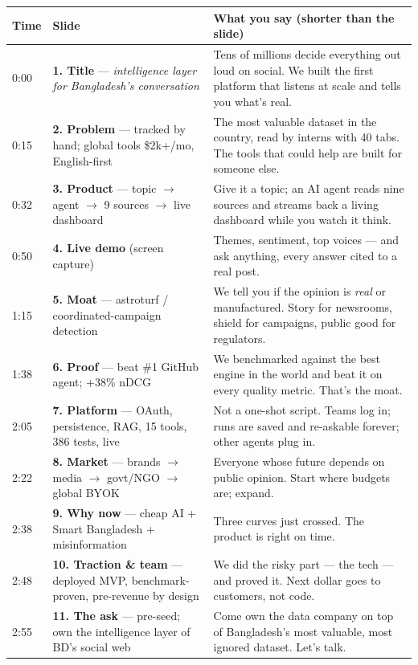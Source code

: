 \documentclass[11pt]{article}
\begin{document}
\renewcommand{\arraystretch}{1.25}
\begin{tabularx}{\linewidth}{@{}p{1.5cm} >{\raggedright\arraybackslash}p{4.2cm} X@{}}
\toprule
\rowcolor{ptpanel!8}\textbf{Time} & \textbf{Slide} & \textbf{What you say (shorter than the slide)}\\
\midrule
0:00 & \textbf{1. Title} — \emph{intelligence layer for Bangladesh's conversation} & Tens of millions decide everything out loud on social. We built the first platform that listens at scale and tells you what's real.\\
\rowcolor{ptpanel!5}0:15 & \textbf{2. Problem} — tracked by hand; global tools \$2k+/mo, English-first & The most valuable dataset in the country, read by interns with 40 tabs. The tools that could help are built for someone else.\\
0:32 & \textbf{3. Product} — topic $\rightarrow$ agent $\rightarrow$ 9 sources $\rightarrow$ live dashboard & Give it a topic; an AI agent reads nine sources and streams back a living dashboard while you watch it think.\\
\rowcolor{ptpanel!5}0:50 & \textbf{4. Live demo} (screen capture) & Themes, sentiment, top voices — and ask anything, every answer cited to a real post.\\
1:15 & \textbf{5. Moat} — astroturf / coordinated-campaign detection & We tell you if the opinion is \emph{real} or manufactured. Story for newsrooms, shield for campaigns, public good for regulators.\\
\rowcolor{ptpanel!5}1:38 & \textbf{6. Proof} — beat \#1 GitHub agent; +38\% nDCG & We benchmarked against the best engine in the world and beat it on every quality metric. That's the moat.\\
2:05 & \textbf{7. Platform} — OAuth, persistence, RAG, 15 tools, 386 tests, live & Not a one-shot script. Teams log in; runs are saved and re-askable forever; other agents plug in.\\
\rowcolor{ptpanel!5}2:22 & \textbf{8. Market} — brands $\rightarrow$ media $\rightarrow$ govt/NGO $\rightarrow$ global BYOK & Everyone whose future depends on public opinion. Start where budgets are; expand.\\
2:38 & \textbf{9. Why now} — cheap AI + Smart Bangladesh + misinformation & Three curves just crossed. The product is right on time.\\
\rowcolor{ptpanel!5}2:48 & \textbf{10. Traction \& team} — deployed MVP, benchmark-proven, pre-revenue by design & We did the risky part — the tech — and proved it. Next dollar goes to customers, not code.\\
2:55 & \textbf{11. The ask} — pre-seed; own the intelligence layer of BD's social web & Come own the data company on top of Bangladesh's most valuable, most ignored dataset. Let's talk.\\
\bottomrule
\end{tabularx}
\end{document}
